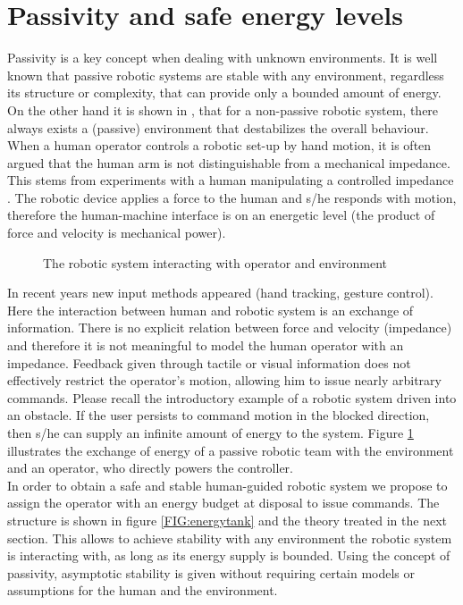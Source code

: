 \documentclass[a4paper,twoside, openright,12pt]{report}
\begin{document}
{\section{Passivity and safe energy levels}\label{S:PassivitySafety}
Passivity is a key concept when dealing with unknown environments. It is well known that passive robotic systems are stable with any environment, regardless its structure or complexity, that can provide only a bounded amount of energy. On the other hand it is shown in \cite{Stramigioli_15}, that for a non-passive robotic system, there always exists a (passive) environment that destabilizes the overall behaviour.\\
When a human operator controls a robotic set-up by hand motion, it is often argued that the human arm is not distinguishable from a mechanical impedance. This stems from experiments with a human manipulating a controlled impedance \cite{Hogan_89}. The robotic device applies a force to the human and s/he responds with motion, therefore the human-machine interface is on an energetic level (the product of force and velocity is mechanical power).
\begin{figure}[b!]
	\centering
	\small
	\def\svgwidth{0.95\columnwidth}
	
	\vspace{10pt}
	\caption{The robotic system interacting with operator and environment}
	\label{FIG:passivityenvironment}
\end{figure}
In recent years new input methods appeared (hand tracking, gesture control). Here the interaction between human and robotic system is an exchange of information. There is no explicit relation between force and velocity (impedance) and therefore it is not meaningful to model the human operator with an impedance. Feedback given through tactile or visual information does not effectively restrict the operator's motion, allowing him to issue nearly arbitrary commands. Please recall the introductory example of a robotic system driven into an obstacle. If the user persists to command motion in the blocked direction, then s/he can supply an infinite amount of energy to the system. Figure \ref{FIG:passivityenvironment} illustrates the exchange of energy of a passive robotic team with the environment and an operator, who directly powers the controller.\\
In order to obtain a safe and stable human-guided robotic system we propose to assign the operator with an energy budget at disposal to issue commands. The structure is shown in figure \ref{FIG:energytank} and the theory treated in the next section. This allows to achieve stability with any environment the robotic system is interacting with, as long as its energy supply is bounded. Using the concept of passivity, asymptotic stability is given without requiring certain models or assumptions for the human and the environment.\\
}
\end{document}
